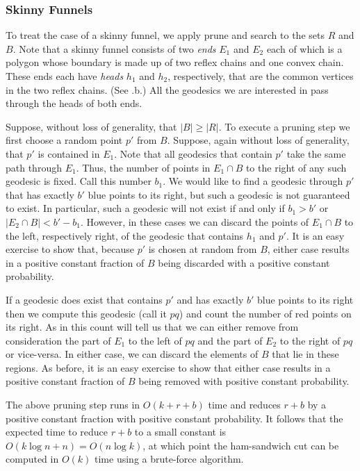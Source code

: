 \documentclass[charterfonts,lotsofwhite]{patmorin}
\begin{document}
\subsubsection{Skinny Funnels}

To treat the case of a skinny funnel, we apply prune and search to the
sets $R$ and $B$. Note that a skinny funnel consists of two
\emph{ends} $E_1$ and $E_2$ each of which is a polygon whose boundary
is made up of two reflex chains and one convex chain.  These ends each
have \emph{heads} $h_1$ and $h_2$, respectively, that are the common
vertices in the two reflex chains.  (See .b.) All the
geodesics we are interested in pass through the heads of both ends. 

Suppose, without loss of generality, that $|B|\ge |R|$.  To execute a
pruning step we first choose a random point $p'$ from $B$. Suppose,
again without loss of generality, that $p'$ is contained in $E_1$.
Note that all geodesics that contain $p'$ take the same path through
$E_1$.  Thus, the number of points in $E_1\cap B$ to the right of any
such geodesic is fixed. Call this number $b_1$.  We would like to find
a geodesic through $p'$ that has exactly $b'$ blue points to its right, but
such a geodesic is not guaranteed to exist.  In particular, such a
geodesic will not exist if and only if $b_1 > b'$ or $|E_2\cap B| <
b'-b_1$.  However, in these cases we can discard the points of
$E_1\cap B$ to the left, respectively right, of the geodesic that
contains $h_1$ and $p'$.  It is an easy exercise to show that, because
$p'$ is chosen at random from $B$, either case results in a positive
constant fraction of $B$ being discarded with a positive constant
probability.

If a geodesic does exist that contains $p'$ and has exactly $b'$ blue
points to its right then we compute this geodesic (call it $pq$) and
count the number of red points on its right.  As in
 this count will tell us that we can
either remove from consideration the part of $E_1$ to the left of $pq$
and the part of $E_2$ to the right of $pq$ or vice-versa.  In either
case, we can discard the elements of $B$ that lie in these regions.
As before, it is an easy exercise to show that either case results in
a positive constant fraction of $B$ being removed with positive
constant probability.

The above pruning step runs in $O(k+r+b)$ time and reduces $r+b$ by a
positive constant fraction with positive constant probability.  It
follows that the expected time to reduce $r+b$ to a small constant is
$O(k\log n + n) = O(n\log k)$, at which point the ham-sandwich cut can
be computed in $O(k)$ time using a brute-force algorithm.
\end{document}
